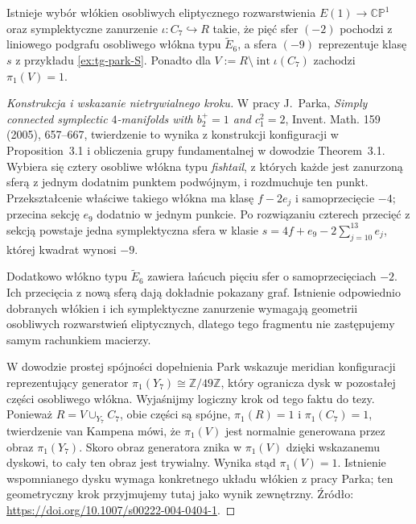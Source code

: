 \begin{twierdzenie}
\label{thm:tg-park-embedding}
Istnieje wybór włókien osobliwych eliptycznego rozwarstwienia
$E(1)\to\mathbb{CP}^{1}$ oraz symplektyczne zanurzenie
$\iota\colon C_7\hookrightarrow R$ takie, że pięć sfer
$(-2)$ pochodzi z liniowego podgrafu osobliwego włókna
typu $\widetilde E_6$, a sfera $(-9)$ reprezentuje klasę
$s$ z przykładu \ref{ex:tg-park-S}. Ponadto dla
$V:=R\setminus\operatorname{int}\iota(C_7)$ zachodzi
$\pi_1(V)=1$.
\end{twierdzenie}

\begin{proof}[Konstrukcja i wskazanie nietrywialnego kroku]
W pracy J.~Parka, \emph{Simply connected symplectic
$4$-manifolds with $b_2^+=1$ and $c_1^2=2$},
Invent. Math. 159 (2005), 657--667, twierdzenie to
wynika z konstrukcji konfiguracji w Proposition~3.1 i
obliczenia grupy fundamentalnej w dowodzie Theorem~3.1.
Wybiera się cztery osobliwe włókna typu \emph{fishtail},
z których każde jest zanurzoną sferą z jednym dodatnim
punktem podwójnym, i rozdmuchuje ten punkt. Przekształcenie
właściwe takiego włókna ma klasę $f-2e_j$ i
samoprzecięcie $-4$; przecina sekcję $e_9$ dodatnio
w jednym punkcie. Po rozwiązaniu czterech przecięć z sekcją
powstaje jedna symplektyczna sfera w klasie
$s=4f+e_9-2\sum_{j=10}^{13}e_j$, której kwadrat
wynosi $-9$.

Dodatkowo włókno typu $\widetilde E_6$ zawiera łańcuch
pięciu sfer o samoprzecięciach $-2$. Ich przecięcia
z nową sferą dają dokładnie pokazany graf. Istnienie
odpowiednio dobranych włókien i ich symplektyczne
zanurzenie wymagają geometrii osobliwych rozwarstwień
eliptycznych, dlatego tego fragmentu nie zastępujemy
samym rachunkiem macierzy.

W dowodzie prostej spójności dopełnienia Park wskazuje
meridian konfiguracji reprezentujący generator
$\pi_1(Y_7)\cong\mathbb Z/49\mathbb Z$, który ogranicza
dysk w pozostałej części osobliwego włókna.
Wyjaśnijmy logiczny krok od tego faktu do tezy.
Ponieważ $R=V\cup_{Y_7} C_7$, obie części są spójne,
$\pi_1(R)=1$ i $\pi_1(C_7)=1$, twierdzenie van Kampena
mówi, że $\pi_1(V)$ jest normalnie generowana przez
obraz $\pi_1(Y_7)$. Skoro obraz generatora znika w
$\pi_1(V)$ dzięki wskazanemu dyskowi, to cały ten obraz
jest trywialny. Wynika stąd $\pi_1(V)=1$.
Istnienie wspomnianego dysku wymaga konkretnego układu
włókien z pracy Parka; ten geometryczny krok przyjmujemy
tutaj jako wynik zewnętrzny. Źródło: \url{https://doi.org/10.1007/s00222-004-0404-1}.
\end{proof}


